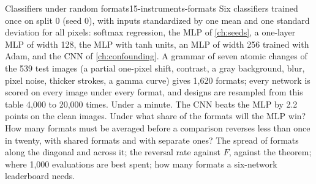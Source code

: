 \begin{refsection}
\begin{lab}{Classifiers under random formats}{15-instruments-formats}\label{lab:instruments:formats}
 Six classifiers trained once on split 0 (seed 0), with inputs standardized by one mean and one standard deviation for all pixels: softmax regression, the MLP of \cref{ch:seeds}, a one-layer MLP of width 128, the MLP with tanh units, an MLP of width 256 trained with Adam, and the CNN of \cref{ch:confounding}. A grammar of seven atomic changes of the 539 test images (a partial one-pixel shift, contrast, a gray background, blur, pixel noise, thicker strokes, a gamma curve) gives 1,620 formats; every network is scored on every image under every format, and designs are resampled from this table 4,000 to 20,000 times. Under a minute.
 The CNN beats the MLP by 2.2 points on the clean images. Under what share of the formats will the MLP win? How many formats must be averaged before a comparison reverses less than once in twenty, with shared formats and with separate ones?
 The spread of formats along the diagonal and across it; the reversal rate against $F$, against the theorem; where 1,000 evaluations are best spent; how many formats a six-network leaderboard needs.
\end{lab}


\end{refsection}
